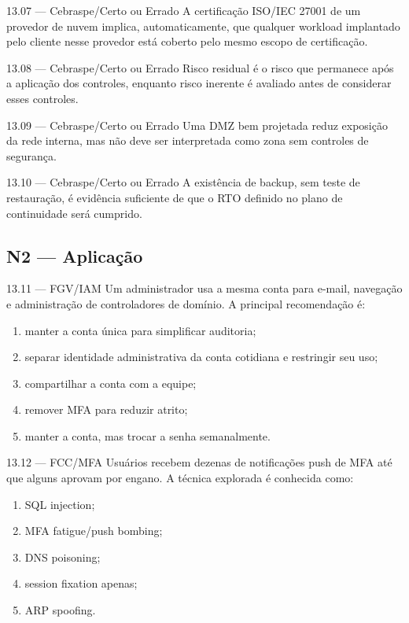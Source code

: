 \begin{questao}{ 13.07 — Cebraspe/Certo ou Errado}
A certificação ISO/IEC 27001 de um provedor de nuvem implica, automaticamente, que qualquer workload implantado pelo cliente nesse provedor está coberto pelo mesmo escopo de certificação.
\end{questao}

\begin{questao}{ 13.08 — Cebraspe/Certo ou Errado}
Risco residual é o risco que permanece após a aplicação dos controles, enquanto risco inerente é avaliado antes de considerar esses controles.
\end{questao}

\begin{questao}{ 13.09 — Cebraspe/Certo ou Errado}
Uma DMZ bem projetada reduz exposição da rede interna, mas não deve ser interpretada como zona sem controles de segurança.
\end{questao}

\begin{questao}{ 13.10 — Cebraspe/Certo ou Errado}
A existência de backup, sem teste de restauração, é evidência suficiente de que o RTO definido no plano de continuidade será cumprido.
\end{questao}

\subsection*{N2 — Aplicação}

\begin{questao}{ 13.11 — FGV/IAM}
Um administrador usa a mesma conta para e-mail, navegação e administração de controladores de domínio. A principal recomendação é:
\begin{enumerate}[label=\Alph*)]
\item manter a conta única para simplificar auditoria;
\item separar identidade administrativa da conta cotidiana e restringir seu uso;
\item compartilhar a conta com a equipe;
\item remover MFA para reduzir atrito;
\item manter a conta, mas trocar a senha semanalmente.
\end{enumerate}
\end{questao}

\begin{questao}{ 13.12 — FCC/MFA}
Usuários recebem dezenas de notificações push de MFA até que alguns aprovam por engano. A técnica explorada é conhecida como:
\begin{enumerate}[label=\Alph*)]
\item SQL injection;
\item MFA fatigue/push bombing;
\item DNS poisoning;
\item session fixation apenas;
\item ARP spoofing.
\end{enumerate}
\end{questao}


